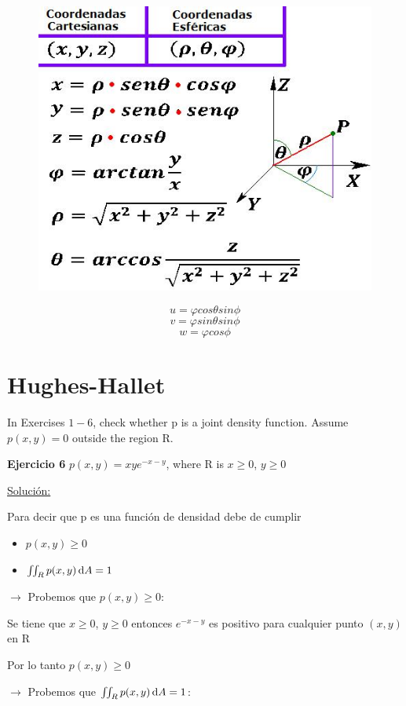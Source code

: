 \documentclass{report}
\newcommand{\s}{\underline{Soluci\'{o}n:}}
\begin{document}
	\begin{figure}[h]
		\includegraphics[scale=0.5]{ce.JPG}
		\centering
	\end{figure}
	
	\[u = \varphi cos \theta sin \phi \]
	\[ v = \varphi sin \theta sin \phi \]
	\[ w = \varphi cos \phi \]

	\section*{Hughes-Hallet}
	In Exercises $1-6$, check whether p is a joint density function. Assume $p(x, y) = 0$ outside the region R.
	
	\textbf{Ejercicio 6} $p(x, y) = xye^{-x-y}$, where R is $x \geq 0$, $y \geq 0$
	
	\s
	
	Para decir que p es una funci\'{o}n de densidad debe de cumplir 
	\begin{itemize}
		\item $p(x, y) \geq 0$
		\item $\iint_R p(x, y) \, \text dA = 1$
	\end{itemize}

	$\rightarrow$ Probemos que $p(x, y) \geq 0$:
	
	Se tiene que $x \geq 0$, $y \geq 0$ entonces $e^{-x-y}$ es positivo para cualquier punto $(x, y)$ en R
	
	Por lo tanto $p(x, y) \geq 0$
	
	$\rightarrow$ Probemos que $\iint_R p(x, y) \, \text dA = 1$:
	
\end{document}
